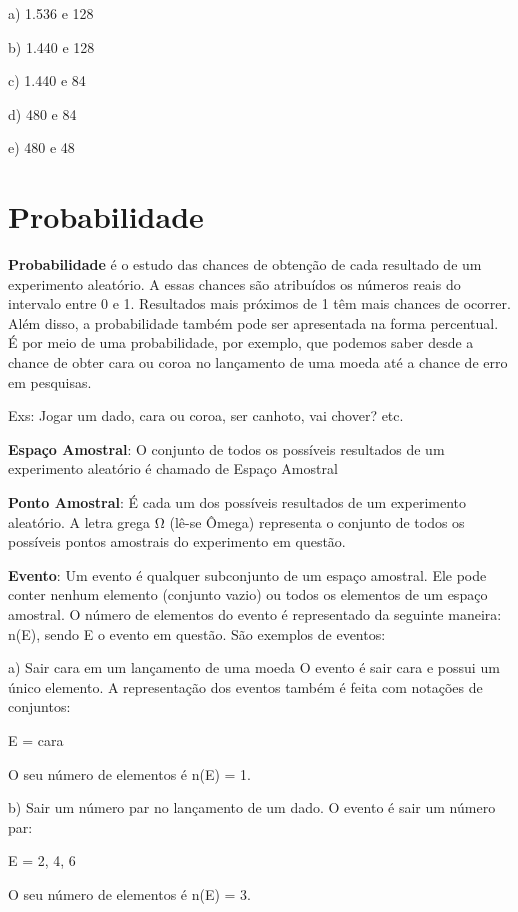 \begin{multicols*}{2}
\begin{enumerate}
a) 1.536 e 128

b) 1.440 e 128

c) 1.440 e 84

d) 480 e 84

e) 480 e 48



\end{enumerate}

\section{Probabilidade}

\textbf{Probabilidade} é o estudo das chances de obtenção de cada resultado de um experimento aleatório. A essas chances são atribuídos os números reais do intervalo entre 0 e 1. Resultados mais próximos de 1 têm mais chances de ocorrer. Além disso, a probabilidade também pode ser apresentada na forma percentual. É por meio de uma probabilidade, por exemplo, que podemos saber desde a chance de obter cara ou coroa no lançamento de uma moeda até a chance de erro em pesquisas.

Exs: Jogar um dado, cara ou coroa, ser canhoto, vai chover? etc.

\textbf{Espaço Amostral}: O conjunto de todos os possíveis resultados de um experimento aleatório é chamado de Espaço Amostral

\textbf{Ponto Amostral}: É cada um dos possíveis resultados de um experimento aleatório.
A letra grega Ω (lê-se Ômega) representa o conjunto de todos os possíveis pontos amostrais do experimento em questão.

\textbf{Evento}: Um evento é qualquer subconjunto de um espaço amostral. Ele pode conter nenhum elemento (conjunto vazio) ou todos os elementos de um espaço amostral. O número de elementos do evento é representado da seguinte maneira: n(E), sendo E o evento em questão. São exemplos de eventos:

a) Sair cara em um lançamento de uma moeda O evento é sair cara e possui um único elemento. A representação dos eventos também é feita com notações de conjuntos:

E = {cara}

O seu número de elementos é n(E) = 1.

b) Sair um número par no lançamento de um dado. O evento é sair um número par:

E = {2, 4, 6}

O seu número de elementos é n(E) = 3.


\end{multicols*}
